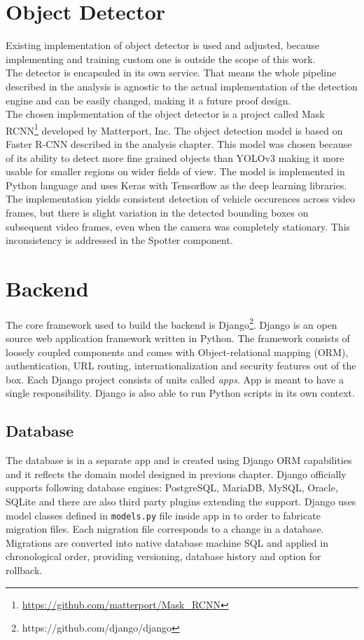 \documentclass[thesis=M,english]{FITthesis}[2019/03/06]
\begin{document}
\section{Object Detector}
Existing implementation of object detector is used and adjusted, because implementing and training custom one is outside the scope of this work.\\

The detector is encapsuled in its own service. That means the whole pipeline described in the analysis is agnostic to the actual implementation of the detection engine and can be easily changed, making it a future proof design.\\

The chosen implementation of the object detector is a project called Mask RCNN\footnote{\url{https://github.com/matterport/Mask_RCNN}} developed by Matterport, Inc. The object detection model is based on Faster R-CNN described in the analysis chapter. This model was chosen because of its ability to detect more fine grained objects than YOLOv3 making it more usable for smaller regions on wider fields of view. The model is implemented in Python language and uses Keras with Tensorflow as the deep learning libraries.\\

The implementation yields consistent detection of vehicle occurences across video frames, but there is slight variation in the detected bounding boxes on subsequent video frames, even when the camera was completely stationary. This inconsistency is addressed in the Spotter component.

\section{Backend}
The core framework used to build the backend is Django\footnote{https://github.com/django/django}. Django is an open source web application framework written in Python. The framework consists of loosely coupled components and comes with Object-relational mapping (ORM), authentication, URL routing, internationalization and security features out of the box. Each Django project consists of units called \textit{apps}. App is meant to have a single responsibility. Django is also able to run Python scripts in its own context.\\

\subsection{Database}
The database is in a separate app and is created using Django ORM capabilities and it reflects the domain model designed in previous chapter.
Django officially supports following database engines: PostgreSQL, MariaDB, MySQL, Oracle, SQLite and there are also third party plugins extending the support. Django uses model classes defined in \texttt{models.py} file inside app in to order to fabricate migration files. Each migration file corresponds to a change in a database. Migrations are converted into native database machine SQL and applied in chronological order, providing versioning, database history and option for rollback.\\
\end{document}
